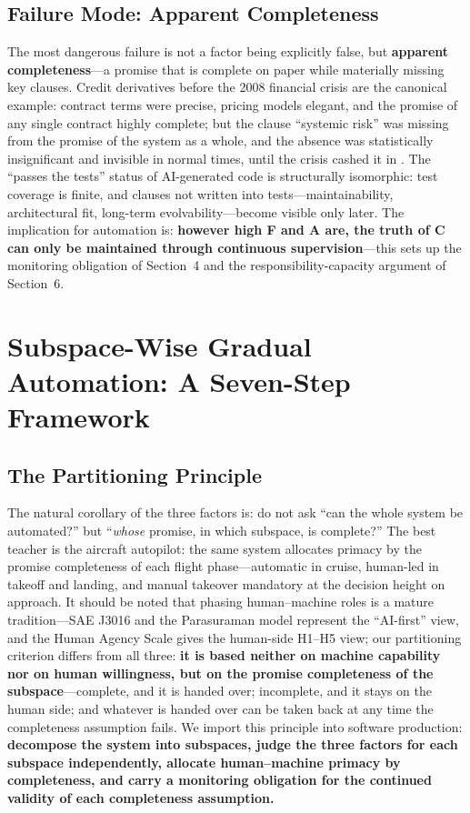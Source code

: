 \documentclass[11pt]{article}
\begin{document}
\subsection{Failure Mode: Apparent Completeness}
The most dangerous failure is not a factor being explicitly false, but
\textbf{apparent completeness}---a promise that is complete on paper while
materially missing key clauses. Credit derivatives before the 2008
financial crisis are the canonical example: contract terms were precise,
pricing models elegant, and the promise of any single contract highly
complete; but the clause ``systemic risk'' was missing from the promise of
the system as a whole, and the absence was statistically insignificant and
invisible in normal times, until the crisis cashed it in \cite{fcic}. The
``passes the tests'' status of AI-generated code is structurally
isomorphic: test coverage is finite, and clauses not written into
tests---maintainability, architectural fit, long-term evolvability---become
visible only later. The implication for automation is: \textbf{however high
F and A are, the truth of C can only be maintained through continuous
supervision}---this sets up the monitoring obligation of Section~4 and the
responsibility-capacity argument of Section~6.

\section{Subspace-Wise Gradual Automation: A Seven-Step Framework}
\subsection{The Partitioning Principle}
The natural corollary of the three factors is: do not ask ``can the whole
system be automated?'' but ``\emph{whose} promise, in which subspace, is
complete?'' The best teacher is the aircraft autopilot: the same system
allocates primacy by the promise completeness of each flight
phase---automatic in cruise, human-led in takeoff and landing, and manual
takeover mandatory at the decision height on approach. It should be noted
that phasing human--machine roles is a mature tradition---SAE J3016 and the
Parasuraman model \cite{parasuraman2000} represent the ``AI-first'' view,
and the Human Agency Scale \cite{shao} gives the human-side H1--H5 view;
our partitioning criterion differs from all three: \textbf{it is based
neither on machine capability nor on human willingness, but on the promise
completeness of the subspace}---complete, and it is handed over;
incomplete, and it stays on the human side; and whatever is handed over can
be taken back at any time the completeness assumption fails. We import this
principle into software production: \textbf{decompose the system into
subspaces, judge the three factors for each subspace independently,
allocate human--machine primacy by completeness, and carry a monitoring
obligation for the continued validity of each completeness assumption.}
\end{document}
